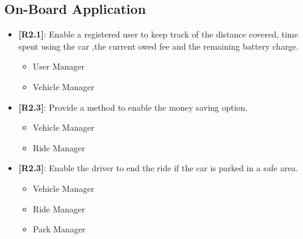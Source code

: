 \subsection{On-Board Application}
\begin{itemize}
	\item{\textbf{[R2.1]}}: Enable a registered user to keep track of the distance covered, time spent using the car ,the current owed fee and the remaining battery charge.
	\begin{itemize}
	\item User Manager
	\item Vehicle Manager\\
	\end{itemize}
	\item{\textbf{[R2.3]}}: Provide a method to enable the money saving option.
	\begin{itemize}
	\item Vehicle Manager
	\item Ride Manager\\
	\end{itemize}
	\item{\textbf{[R2.3]}}: Enable the driver to end the ride if the car is parked in a safe area.
	\begin{itemize}
	\item Vehicle Manager
	\item Ride Manager
	\item Park Manager\\
	\end{itemize}
 \end{itemize}


